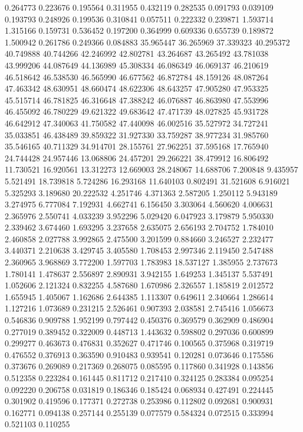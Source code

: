 0.264773
0.223676
0.195564
0.311955
0.432119
0.282535
0.091793
0.039109
0.193793
0.248926
0.199536
0.310841
0.057511
0.222332
0.239871
1.593714
1.315166
0.159731
0.536452
0.197200
0.364999
0.609336
0.655739
0.189872
1.500942
0.261786
0.249366
0.084883
35.965447
36.265969
37.339323
40.295372
40.749888
40.744266
42.246992
42.802781
43.264687
43.265492
43.781038
43.999206
44.087649
44.136989
45.308334
46.086349
46.069137
46.210619
46.518642
46.538530
46.565990
46.677562
46.872784
48.159126
48.087264
47.463342
48.630951
48.660474
48.622306
48.643257
47.905280
47.953325
45.515714
46.781825
46.316648
47.388242
46.076887
46.863980
47.553996
46.455092
46.780229
49.621322
49.683642
47.471739
48.027825
45.931728
46.642912
47.340063
41.750582
47.440098
46.002516
35.527972
34.727241
35.033851
46.438489
39.859322
31.927330
33.759287
38.977234
31.985760
35.546165
40.711329
34.914701
28.155761
27.962251
37.595168
17.765940
24.744428
24.957446
13.068806
24.457201
29.266221
38.479912
16.806492
11.730521
16.920561
13.312273
12.669003
28.248067
14.688706
7.200848
9.435957
5.521491
18.739818
5.724286
16.293168
11.640103
0.802491
31.521608
6.916021
5.325293
3.189680
20.222532
4.251746
4.371363
2.587205
1.250112
5.943189
3.274975
6.777084
7.192931
4.662741
6.156450
3.303064
4.560620
4.006631
2.365976
2.550741
4.033239
3.952296
5.029420
6.047923
3.179879
5.950330
2.339462
3.674460
1.693295
3.237658
2.635075
2.656193
2.704752
1.784010
2.460858
2.027788
3.992865
2.475500
3.201599
0.884660
3.246527
2.232477
3.440371
2.210638
3.429745
3.405580
1.708453
2.997346
2.119450
2.547488
2.360965
3.968869
3.772200
1.597703
1.783983
18.537127
1.385955
2.737673
1.780141
1.478637
2.556897
2.890931
3.942155
1.649253
1.345137
5.537491
1.052606
2.121324
0.832255
4.587680
1.670986
2.326557
1.185819
2.012572
1.655945
1.405067
1.162686
2.644385
1.113307
0.649611
2.340664
1.286614
1.127216
1.073689
0.231215
2.526461
0.907393
2.038581
2.745416
1.056673
0.546836
0.909788
1.952199
0.797442
0.450376
0.369579
0.362909
0.486904
0.277019
0.389452
0.322009
0.448713
1.443632
0.598802
0.297036
0.600899
0.299277
0.463673
0.476831
0.352627
0.471746
0.100565
0.375968
0.319719
0.476552
0.376913
0.363590
0.910483
0.939541
0.120281
0.073646
0.175586
0.373676
0.269089
0.217369
0.268075
0.085595
0.117860
0.341928
0.143856
0.512358
0.223284
0.161445
0.811712
0.217410
0.324125
0.283384
0.095254
0.092220
0.206758
0.031819
0.186346
0.185424
0.068934
0.427491
0.224445
0.301902
0.419596
0.177371
0.272738
0.253986
0.112802
0.092681
0.900931
0.162771
0.094138
0.257144
0.255139
0.077579
0.584324
0.072515
0.333994
0.521103
0.110255
